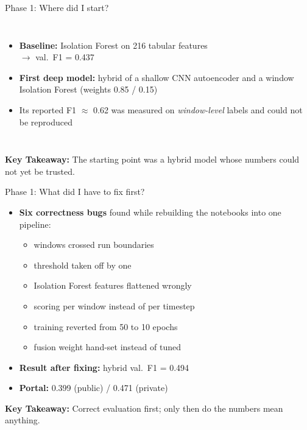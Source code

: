 \documentclass{beamer}
\newcommand{\takeaway}[1]{\par\vspace{0.4em}\noindent\textbf{Key Takeaway:} #1}
\begin{document}
\begin{frame}{Phase 1: Where did I start?}
\begin{columns}[T]
\begin{itemize}
  \item \textbf{Baseline:} Isolation Forest on 216 tabular features\\ $\rightarrow$ val.\ F1 = 0.437
  \item \textbf{First deep model:} hybrid of a shallow CNN autoencoder and a window Isolation Forest (weights 0.85 / 0.15)
  \item Its reported F1 $\approx$ 0.62 was measured on \emph{window-level} labels and could not be reproduced
\end{itemize}
\centering
{}
\end{columns}
\vspace{0.3em}
\takeaway{The starting point was a hybrid model whose numbers could not yet be trusted.}
\end{frame}

\begin{frame}{Phase 1: What did I have to fix first?}
\begin{itemize}
  \item \textbf{Six correctness bugs} found while rebuilding the notebooks into one pipeline:
  \begin{itemize}
    \item windows crossed run boundaries
    \item threshold taken off by one
    \item Isolation Forest features flattened wrongly
    \item scoring per window instead of per timestep
    \item training reverted from 50 to 10 epochs
    \item fusion weight hand-set instead of tuned
  \end{itemize}
  \item \textbf{Result after fixing:} hybrid val.\ F1 = 0.494
  \item \textbf{Portal:} 0.399 (public) / 0.471 (private)
\end{itemize}
\takeaway{Correct evaluation first; only then do the numbers mean anything.}
\end{frame}
\end{document}
